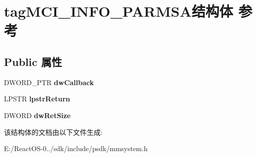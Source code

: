 \hypertarget{structtag_m_c_i___i_n_f_o___p_a_r_m_s_a}{}\section{tag\+M\+C\+I\+\_\+\+I\+N\+F\+O\+\_\+\+P\+A\+R\+M\+S\+A结构体 参考}
\label{structtag_m_c_i___i_n_f_o___p_a_r_m_s_a}
\subsection*{Public 属性}
\begin{DoxyCompactItemize}
\item 
\mbox{\label{structtag_m_c_i___i_n_f_o___p_a_r_m_s_a_add88483a1b35a600b6f92efdad70bf3d}} 
D\+W\+O\+R\+D\+\_\+\+P\+TR {\bfseries dw\+Callback}
\item 
\mbox{\label{structtag_m_c_i___i_n_f_o___p_a_r_m_s_a_adfac702ab500ad16cb2943f80e84c39d}} 
L\+P\+S\+TR {\bfseries lpstr\+Return}
\item 
\mbox{\label{structtag_m_c_i___i_n_f_o___p_a_r_m_s_a_a56d64c61ab624ef483103649bfecd572}} 
D\+W\+O\+RD {\bfseries dw\+Ret\+Size}
\end{DoxyCompactItemize}


该结构体的文档由以下文件生成\+:\begin{DoxyCompactItemize}
\item 
E\+:/\+React\+O\+S-\/0../sdk/include/psdk/mmsystem.\+h\end{DoxyCompactItemize}
